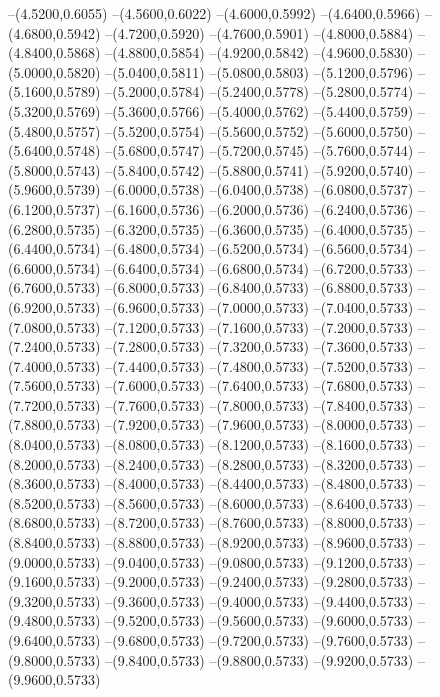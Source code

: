 {	--(4.5200,0.6055)
	--(4.5600,0.6022)
	--(4.6000,0.5992)
	--(4.6400,0.5966)
	--(4.6800,0.5942)
	--(4.7200,0.5920)
	--(4.7600,0.5901)
	--(4.8000,0.5884)
	--(4.8400,0.5868)
	--(4.8800,0.5854)
	--(4.9200,0.5842)
	--(4.9600,0.5830)
	--(5.0000,0.5820)
	--(5.0400,0.5811)
	--(5.0800,0.5803)
	--(5.1200,0.5796)
	--(5.1600,0.5789)
	--(5.2000,0.5784)
	--(5.2400,0.5778)
	--(5.2800,0.5774)
	--(5.3200,0.5769)
	--(5.3600,0.5766)
	--(5.4000,0.5762)
	--(5.4400,0.5759)
	--(5.4800,0.5757)
	--(5.5200,0.5754)
	--(5.5600,0.5752)
	--(5.6000,0.5750)
	--(5.6400,0.5748)
	--(5.6800,0.5747)
	--(5.7200,0.5745)
	--(5.7600,0.5744)
	--(5.8000,0.5743)
	--(5.8400,0.5742)
	--(5.8800,0.5741)
	--(5.9200,0.5740)
	--(5.9600,0.5739)
	--(6.0000,0.5738)
	--(6.0400,0.5738)
	--(6.0800,0.5737)
	--(6.1200,0.5737)
	--(6.1600,0.5736)
	--(6.2000,0.5736)
	--(6.2400,0.5736)
	--(6.2800,0.5735)
	--(6.3200,0.5735)
	--(6.3600,0.5735)
	--(6.4000,0.5735)
	--(6.4400,0.5734)
	--(6.4800,0.5734)
	--(6.5200,0.5734)
	--(6.5600,0.5734)
	--(6.6000,0.5734)
	--(6.6400,0.5734)
	--(6.6800,0.5734)
	--(6.7200,0.5733)
	--(6.7600,0.5733)
	--(6.8000,0.5733)
	--(6.8400,0.5733)
	--(6.8800,0.5733)
	--(6.9200,0.5733)
	--(6.9600,0.5733)
	--(7.0000,0.5733)
	--(7.0400,0.5733)
	--(7.0800,0.5733)
	--(7.1200,0.5733)
	--(7.1600,0.5733)
	--(7.2000,0.5733)
	--(7.2400,0.5733)
	--(7.2800,0.5733)
	--(7.3200,0.5733)
	--(7.3600,0.5733)
	--(7.4000,0.5733)
	--(7.4400,0.5733)
	--(7.4800,0.5733)
	--(7.5200,0.5733)
	--(7.5600,0.5733)
	--(7.6000,0.5733)
	--(7.6400,0.5733)
	--(7.6800,0.5733)
	--(7.7200,0.5733)
	--(7.7600,0.5733)
	--(7.8000,0.5733)
	--(7.8400,0.5733)
	--(7.8800,0.5733)
	--(7.9200,0.5733)
	--(7.9600,0.5733)
	--(8.0000,0.5733)
	--(8.0400,0.5733)
	--(8.0800,0.5733)
	--(8.1200,0.5733)
	--(8.1600,0.5733)
	--(8.2000,0.5733)
	--(8.2400,0.5733)
	--(8.2800,0.5733)
	--(8.3200,0.5733)
	--(8.3600,0.5733)
	--(8.4000,0.5733)
	--(8.4400,0.5733)
	--(8.4800,0.5733)
	--(8.5200,0.5733)
	--(8.5600,0.5733)
	--(8.6000,0.5733)
	--(8.6400,0.5733)
	--(8.6800,0.5733)
	--(8.7200,0.5733)
	--(8.7600,0.5733)
	--(8.8000,0.5733)
	--(8.8400,0.5733)
	--(8.8800,0.5733)
	--(8.9200,0.5733)
	--(8.9600,0.5733)
	--(9.0000,0.5733)
	--(9.0400,0.5733)
	--(9.0800,0.5733)
	--(9.1200,0.5733)
	--(9.1600,0.5733)
	--(9.2000,0.5733)
	--(9.2400,0.5733)
	--(9.2800,0.5733)
	--(9.3200,0.5733)
	--(9.3600,0.5733)
	--(9.4000,0.5733)
	--(9.4400,0.5733)
	--(9.4800,0.5733)
	--(9.5200,0.5733)
	--(9.5600,0.5733)
	--(9.6000,0.5733)
	--(9.6400,0.5733)
	--(9.6800,0.5733)
	--(9.7200,0.5733)
	--(9.7600,0.5733)
	--(9.8000,0.5733)
	--(9.8400,0.5733)
	--(9.8800,0.5733)
	--(9.9200,0.5733)
	--(9.9600,0.5733)
}
